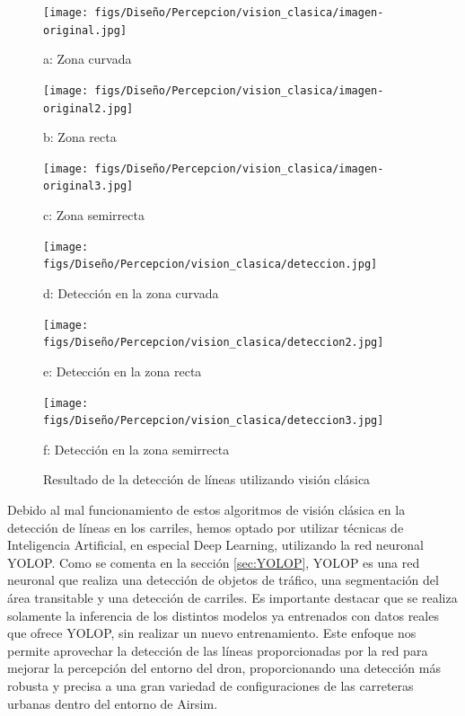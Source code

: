 \begin{figure}[H]
  \centering
  \begin{minipage}[t]{0.3\textwidth}
      \centering
      \texttt{[image: figs/Diseño/Percepcion/vision\_clasica/imagen-original.jpg]}
      \caption*{a: Zona curvada}
  \end{minipage}
  \hfill
  \begin{minipage}[t]{0.3\textwidth}
      \centering
      \texttt{[image: figs/Diseño/Percepcion/vision\_clasica/imagen-original2.jpg]}
      \caption*{b: Zona recta}
  \end{minipage}
  \hfill
  \begin{minipage}[t]{0.3\textwidth}
      \centering
      \texttt{[image: figs/Diseño/Percepcion/vision\_clasica/imagen-original3.jpg]}
      \caption*{c: Zona semirrecta}
  \end{minipage}
  
  \vspace{1cm}
  
  \begin{minipage}[t]{0.3\textwidth}
      \centering
      \texttt{[image: figs/Diseño/Percepcion/vision\_clasica/deteccion.jpg]}
      \caption*{d: Detección en la zona curvada}
  \end{minipage}
  \hfill
  \begin{minipage}[t]{0.3\textwidth}
      \centering
      \texttt{[image: figs/Diseño/Percepcion/vision\_clasica/deteccion2.jpg]}
      \caption*{e: Detección en la zona recta}
  \end{minipage}
  \hfill
  \begin{minipage}[t]{0.3\textwidth}
      \centering
      \texttt{[image: figs/Diseño/Percepcion/vision\_clasica/deteccion3.jpg]}
      \caption*{f: Detección en la zona semirrecta}
  \end{minipage}
  \caption{Resultado de la detección de líneas utilizando visión clásica}
  \label{Vision_clasica}
\end{figure}

Debido al mal funcionamiento de estos algoritmos de visión clásica en la detección de líneas en los carriles, 
hemos optado por utilizar técnicas de Inteligencia Artificial, en especial Deep Learning, utilizando la red neuronal YOLOP. Como se comenta en la sección \ref{sec:YOLOP}, 
YOLOP es una red neuronal que realiza una detección de objetos de tráfico, una segmentación del área transitable y una detección de carriles. Es importante 
destacar que se realiza solamente la inferencia de los distintos modelos ya entrenados con datos reales que ofrece YOLOP, sin realizar un nuevo entrenamiento. Este enfoque nos permite aprovechar 
la detección de las líneas proporcionadas por la red para mejorar la percepción del entorno del dron, proporcionando una detección más robusta y precisa a una gran variedad de configuraciones
de las carreteras urbanas dentro del entorno de Airsim. 


